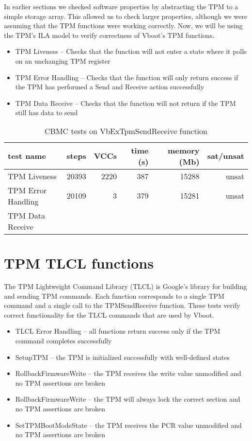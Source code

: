 In earlier sections we checked software properties by abstracting the TPM to a simple storage array. 
This allowed us to check larger properties, although we were assuming that the TPM functions were working correctly.
Now, we will be using the TPM's ILA model to verify correctness of Vboot's TPM functions.

\begin{itemize}
   \item TPM Liveness -- Checks that the function will not enter a state where it polls on an unchanging TPM register
   \item TPM Error Handling -- Checks that the function will only return success if the TPM has performed a Send and Receive action successfully
   \item TPM Data Receive -- Checks that the function will not return if the TPM still has data to send 
\end{itemize}

\begin{table}[!htbp]
    \centering
    \caption{CBMC tests on VbExTpmSendReceive function}\label{tpmSR_results}
    \begin{tabular}{lrrrrr}
        \toprule
        test name & steps & VCCs & time (s) & memory (Mb) & sat/unsat  \\ \midrule
        TPM Liveness & 20393 & 2220 & 387 & 15288 & unsat \\
        TPM Error Handling & 20109 & 3 & 379 & 15281 & unsat \\
        TPM Data Receive &  &  & & \\\bottomrule
    \end{tabular}
\end{table}


\section{TPM TLCL functions}

The TPM Lightweight Command Library (TLCL) is Google's library for building and sending TPM commands.
Each function corresponds to a single TPM command and a single call to the TPMSendReceive function.
These tests verify correct functionality for the TLCL commands that are used by Vboot. 

\begin{itemize}
   \item TLCL Error Handling --  all functions return success only if the TPM command completes successfully
    \item SetupTPM -- the TPM is initialized successfully with well-defined states
    \item RollbackFirmwareWrite -- the TPM receives the write value unmodified and no TPM assertions are broken
    \item RollbackFirmwareWrite -- the TPM will always lock the correct section and no TPM assertions are broken
    \item SetTPMBootModeState -- the TPM receives the PCR value unmodified and no TPM assertions are broken

\end{itemize}

